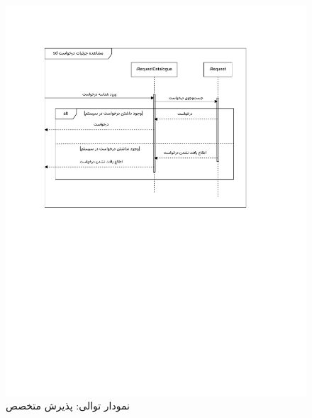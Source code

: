 \begin{figure}[ht!]
	\centering
	\includegraphics[scale=0.8, page=5]{figs/OOD-Sequence-2.pdf}
	\caption{نمودار توالی: پذیرش متخصص}
\end{figure}
\FloatBarrier
\newpage

